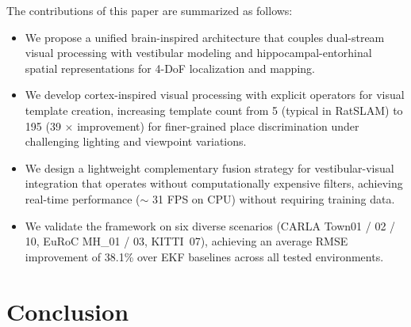 \documentclass[twocolumn,journal]{IEEEtran}
\begin{document}
The contributions of this paper are summarized as follows:
\begin{itemize}
    \item We propose a unified brain-inspired architecture that couples dual-stream visual processing with vestibular modeling and hippocampal-entorhinal spatial representations for 4-DoF localization and mapping.
    \item We develop cortex-inspired visual processing with explicit operators for visual template creation, increasing template count from 5 (typical in RatSLAM) to 195 (39 $\times$ improvement) for finer-grained place discrimination under challenging lighting and viewpoint variations.
    \item We design a lightweight complementary fusion strategy for vestibular-visual integration that operates without computationally expensive filters, achieving real-time performance ($\sim$ 31 FPS on CPU) without requiring training data.
    \item We validate the framework on six diverse scenarios (CARLA Town01 / 02 / 10, EuRoC MH\_01 / 03, KITTI~07), achieving an average RMSE improvement of 38.1\% over EKF baselines across all tested environments.
\end{itemize}










\section{Conclusion}
\label{sec:conclusion}
\end{document}
